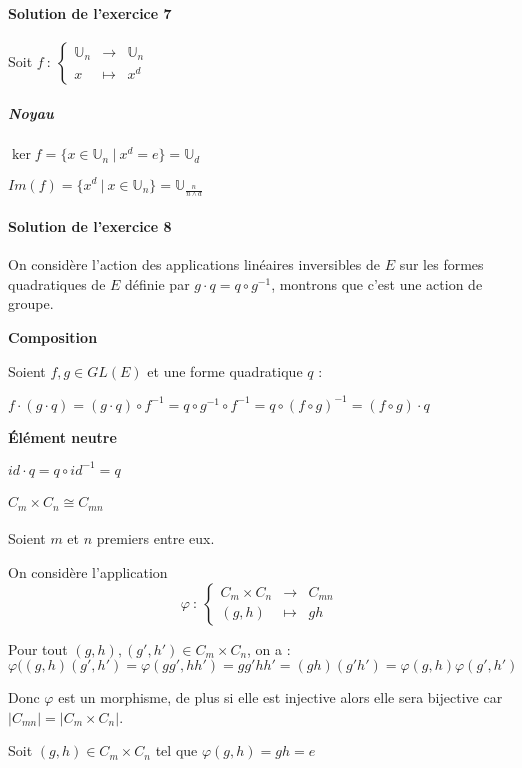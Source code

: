 \documentclass[]{article}
\theoremstyle{remark}
\theoremstyle{definition}
\newcommand{\func}[5]{
#1 ~ : ~ \left\{ \begin{array}{lcl}
	#2 & \longrightarrow & #3 \\
	#4 & \longmapsto & #5
\end{array}
\right.
}
\newenvironment{proofpart}[1]{
	\noindent
	{\textbf{\boldmath #1}}
}{
	\checkmark
}
\begin{document}
\paragraph{Solution de l'exercice 7}

Soit $\func{f}{\mathbb{U}_n}{\mathbb{U}_n}{x}{x^d}$

\subparagraph{Noyau}

$\ker f = \{x \in \mathbb{U}_n ~ | ~ x^d = e \} = \mathbb{U}_d$

$Im(f)=\{x^d ~|~ x \in \mathbb{U}_n\}=\mathbb{U}_{\frac{n}{n \land d}}$

\paragraph{Solution de l'exercice 8}

On considère l'action des applications linéaires inversibles de $E$ sur les formes quadratiques de $E$ définie par $g \cdot q = q \circ g^{-1}$, montrons que c'est une action de groupe.

\begin{proofpart}{Composition}

	Soient $f, g \in GL(E)$ et une forme quadratique $q$ :
	
	$f\cdot(g \cdot q)=(g \cdot q) \circ f^{-1}=q\circ g^{-1}\circ f^{-1}=q \circ (f \circ g)^{-1}=(f \circ g) \cdot q$
\end{proofpart}

\begin{proofpart}{Élément neutre}

	$id \cdot q = q \circ id^{-1} = q$
\end{proofpart}

\paragraph{\boldmath $C_m \times C_n \cong C_{mn}$} Soient $m$ et $n$ premiers entre eux.

On considère l'application
$$\func{\varphi}{C_m \times C_n}{C_{mn}}{(g,h)}{gh}$$

Pour tout $(g, h), (g', h') \in C_m \times C_n$, on a :  $$\varphi((g,h)(g',h')=\varphi(gg',hh')=gg'hh'=(gh)(g'h')=\varphi(g,h)\varphi(g',h')$$

Donc $\varphi$ est un morphisme, de plus si elle est injective alors elle sera bijective car $|C_{mn}| = |C_m \times C_n|$.

Soit $(g,h) \in C_m \times C_n$ tel que $\varphi(g, h) = gh = e$
\end{document}
